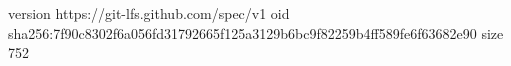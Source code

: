 version https://git-lfs.github.com/spec/v1
oid sha256:7f90c8302f6a056fd31792665f125a3129b6bc9f82259b4ff589fe6f63682e90
size 752
